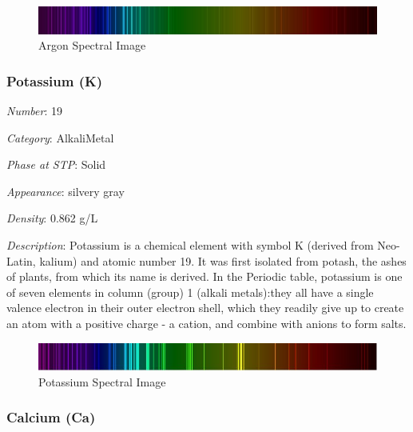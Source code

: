 \documentclass{article}
\begin{document}
\immediate{}
\begin{figure}[!ht]
    \centering
    \includegraphics[width=12cm]{./resources/spectral_img/Argon_Spectrum.png}
    \caption{Argon Spectral Image}
\end{figure}

\hypertarget{subsubsection::K}{}\subsubsection{Potassium (K)}

\textit{Number}: 19

\textit{Category}: AlkaliMetal

\textit{Phase at STP}: Solid

\textit{Appearance}: silvery gray

\textit{Density}: 0.862 g/L

\textit{Description}: Potassium is a chemical element with symbol K (derived from Neo-Latin, kalium) and atomic number 19. It was first isolated from potash, the ashes of plants, from which its name is derived. In the Periodic table, potassium is one of seven elements in column (group) 1 (alkali metals):they all have a single valence electron in their outer electron shell, which they readily give up to create an atom with a positive charge - a cation, and combine with anions to form salts.

\immediate{}
\begin{figure}[!ht]
    \centering
    \includegraphics[width=12cm]{./resources/spectral_img/Potassium_Spectrum.jpg}
    \caption{Potassium Spectral Image}
\end{figure}

\hypertarget{subsubsection::Ca}{}\subsubsection{Calcium (Ca)}
\end{document}
